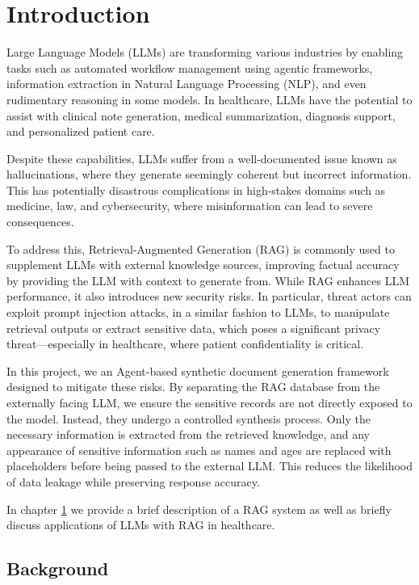 \chapter{Introduction} \label{introduction}
Large Language Models (LLMs) are transforming various industries by enabling tasks such as automated workflow management using agentic frameworks, information extraction in Natural Language Processing (NLP), and even rudimentary reasoning in some models. In healthcare, LLMs have the potential to assist with clinical note generation, medical summarization, diagnosis support, and personalized patient care.

Despite these capabilities, LLMs suffer from a well-documented issue known as hallucinations, where they generate seemingly coherent but incorrect information. This has potentially disastrous complications in high-stakes domains such as medicine, law, and cybersecurity, where misinformation can lead to severe consequences.

To address this, Retrieval-Augmented Generation (RAG) is commonly used to supplement LLMs with external knowledge sources, improving factual accuracy by providing the LLM with context to generate from. While RAG enhances LLM performance, it also introduces new security risks. In particular, threat actors can exploit prompt injection attacks, in a similar fashion to LLMs, to manipulate retrieval outputs or extract sensitive data, which poses a significant privacy threat—especially in healthcare, where patient confidentiality is critical.

In this project, we an Agent-based synthetic document generation framework designed to mitigate these risks. By separating the RAG database from the externally facing LLM, we ensure the sensitive records are not directly exposed to the model. Instead, they undergo a controlled synthesis process. Only the necessary information is extracted from the retrieved knowledge, and any appearance of sensitive information such as names and ages are replaced with placeholders before being passed to the external LLM. This reduces the likelihood of data leakage while preserving response accuracy.

In chapter \ref{introduction} we provide a brief description of a RAG system as well as briefly discuss applications of LLMs with RAG in healthcare.

\section{Background}

